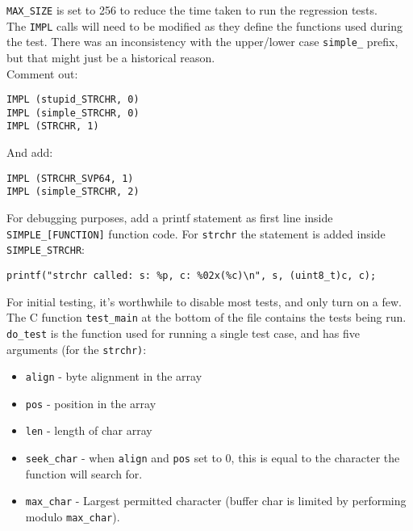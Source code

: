 \texttt{MAX\_SIZE} is set to 256 to reduce the time taken to run
the regression tests.\\

The \texttt{IMPL} calls will need to be modified as they define the
functions used during the test. There was an inconsistency with the
upper/lower case \texttt{simple\_} prefix, but that might just be a
historical reason.\\

Comment out:

\begin{verbatim}
IMPL (stupid_STRCHR, 0)
IMPL (simple_STRCHR, 0)
IMPL (STRCHR, 1)
\end{verbatim}

And add:

\begin{verbatim}
IMPL (STRCHR_SVP64, 1)
IMPL (simple_STRCHR, 2)
\end{verbatim}

For debugging purposes, add a printf statement as first line inside
\texttt{SIMPLE\_[FUNCTION]} function code.
For \texttt{strchr} the statement is added inside \texttt{SIMPLE\_STRCHR}:

\begin{verbatim}
printf("strchr called: s: %p, c: %02x(%c)\n", s, (uint8_t)c, c);
\end{verbatim}

For initial testing, it's worthwhile to disable most tests,
and only turn on a few. The C function \texttt{test\_main} at the bottom
of the file contains the tests being run.\\

\texttt{do\_test} is the function used for running a single test case, and
has five arguments (for the \texttt{strchr)}:

\begin{itemize}
  \item \texttt{align} - byte alignment in the array
  \item \texttt{pos} - position in the array
  \item \texttt{len} - length of char array
  \item \texttt{seek\_char} - when \texttt{align} and \texttt{pos} set to 0,
  this is equal to the character the function will search for.
  \item \texttt{max\_char} - Largest permitted character (buffer char is
  limited by performing modulo \texttt{max\_char}).
\end{itemize}

